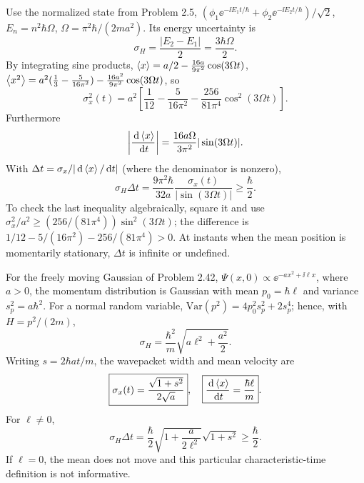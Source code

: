 Use the normalized state from Problem 2.5,
$(\phi_1\ee^{-\ii E_1t/\hbar}
+\phi_2\ee^{-\ii E_2t/\hbar})/\sqrt2$,
$E_n=n^2\hbar\Omega$,
$\Omega=\pi^2\hbar/(2ma^2)$.
Its energy uncertainty is
\begin{equation}
\sigma_H=\frac{|E_2-E_1|}{2}
=\boxed{\frac{3\hbar\Omega}{2}}.
\end{equation}
By integrating sine products,
$\left\langle x\right\rangle=a/2-\frac{16a}{9\pi^2}\cos(3\Omega t)$,
$\left\langle x^2\right\rangle=a^2(\frac13-\frac{5}{16\pi^2})
-\frac{16a^2}{9\pi^2}\cos(3\Omega t)$, so
\begin{equation}
\boxed{\sigma_x^2(t)=a^2
\left[\frac1{12}-\frac{5}{16\pi^2}
-\frac{256}{81\pi^4}\cos^2(3\Omega t)\right]}.
\end{equation}
Furthermore
\begin{equation}
\left|\frac{\,\mathrm{d}\left\langle x\right\rangle}{\,\mathrm{d} t}\right|=
\frac{16a\Omega}{3\pi^2}
|\sin(3\Omega t)|.
\end{equation}
With $\Delta t=\sigma_x/|\,\mathrm{d}\left\langle x\right\rangle/\,\mathrm{d} t|$
(where the denominator is nonzero),
\begin{equation}
\sigma_H\Delta t=
\frac{9\pi^2\hbar}{32a}
\frac{\sigma_x(t)}{|\sin(3\Omega t)|}
\ge\frac{\hbar}{2}.
\end{equation}
To check the last inequality algebraically,
square it and use
$\sigma_x^2/a^2\ge
(256/(81\pi^4))\sin^2(3\Omega t)$;
the difference is
$1/12-5/(16\pi^2)-256/(81\pi^4)>0$.
At instants when the mean position is momentarily
stationary, $\Delta t$ is infinite or undefined.

For the freely moving Gaussian of Problem 2.42,
$\Psi(x,0)\propto\ee^{-ax^2+\ii \ell x}$,
where $a>0$, the momentum distribution is
Gaussian with mean $p_0=\hbar\ell$ and
variance $s_p^2=a\hbar^2$.
For a normal random variable,
$\mathrm{Var}(p^2)=4p_0^2s_p^2+2s_p^4$;
hence, with $H=p^2/(2m)$,
\begin{equation}
\boxed{\sigma_H=
\frac{\hbar^2}{m}\sqrt{a\ell^2+\frac{a^2}{2}}}.
\end{equation}
Writing $s=2\hbar at/m$, the wavepacket width
and mean velocity are
\begin{equation}
\boxed{\sigma_x(t)=\frac{\sqrt{1+s^2}}{2\sqrt a}},
\quad
\boxed{\frac{\,\mathrm{d}\left\langle x\right\rangle}{\,\mathrm{d} t}=\frac{\hbar\ell}{m}}.
\end{equation}
For $\ell\ne0$,
\begin{equation}
\sigma_H\Delta t=
\frac{\hbar}{2}\sqrt{1+\frac{a}{2\ell^2}}
\sqrt{1+s^2}\ge\frac{\hbar}{2}.
\end{equation}
If $\ell=0$, the mean does not move and this
particular characteristic-time definition
is not informative.

